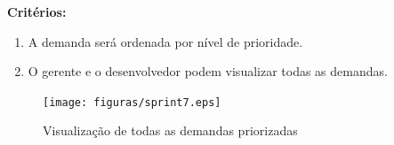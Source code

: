 \textbf{Critérios:}
\begin{enumerate}
	\item A demanda será ordenada por nível de prioridade.
	\item O gerente e o desenvolvedor podem visualizar todas as demandas.
\end{enumerate}

\begin{figure}[H]
    \centering
	\texttt{[image: figuras/sprint7.eps]}
    \caption{Visualização de todas as demandas priorizadas}
    \label{}
\end{figure}
